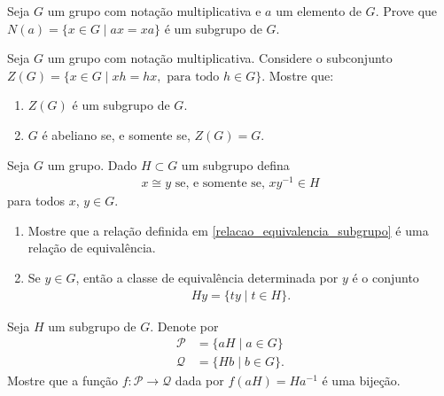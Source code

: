 \documentclass[12pt]{exam}
\begin{document}
    \vspace{.3cm}
    \questao{} Seja $G$ um grupo com nota\c{c}\~ao multiplicativa e $a$ um elemento de $G$. Prove que $N(a) = \{x \in G \mid ax = xa\}$ \'e um subgrupo de $G$.

    \vspace{.3cm}

    \questao{} Seja $G$ um grupo com nota\c{c}\~ao multiplicativa. Considere o subconjunto $Z(G) = \{x \in G \mid xh = hx, \mbox{ para todo } h \in G\}$. Mostre que:
    \begin{enumerate}[label=({\alph*})]
      \item $Z(G)$ \'e um subgrupo de $G$.
      
      \item $G$ \'e abeliano se, e somente se, $Z(G) = G$.
    \end{enumerate}

    \vspace{.3cm}

    \questao{} Seja $G$ um grupo. Dado $H \subset G$ um subgrupo defina
    \begin{align}\label{relacao_equivalencia_subgrupo}
        x \cong y \mbox{ se, e somente se, } xy^{-1} \in H
    \end{align}
    para todos $x$, $y \in G$.
    \begin{enumerate}[label={\alph*})]
        \item Mostre que a rela\c{c}\~ao definida em \eqref{relacao_equivalencia_subgrupo} \'e uma rela\c{c}\~ao de equival\^encia.

        \item Se $y \in G$, ent\~ao a classe de equival\^encia determinada por $y$ \'e o conjunto
        \begin{align*}\label{classe_equivalencia_subgrupo}
            Hy = \{ty \mid t \in H\}.
        \end{align*}
    \end{enumerate}

    \vspace{.3cm}

    \questao{} Seja $H$ um subgrupo de $G$. Denote por
    \begin{align*}
        \mathcal{P} &= \{aH \mid a \in G\}\\
        \mathcal{Q} &= \{Hb \mid b \in G\}.
    \end{align*}
    Mostre que a fun\c{c}\~ao $f : \mathcal{P} \to \mathcal{Q}$ dada por $f(aH) = Ha^{-1}$ \'e uma bije\c{c}\~ao.
\end{document}
